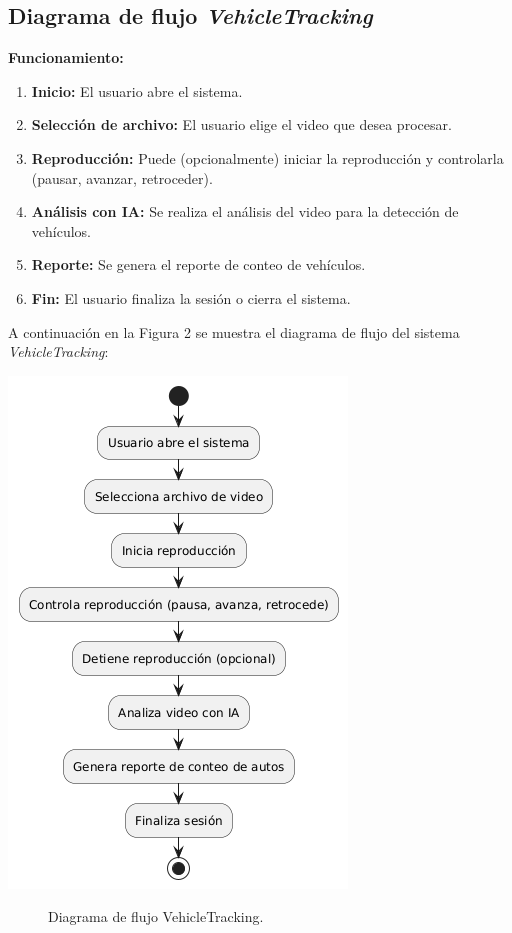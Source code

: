 \documentclass[protocolo.tex]{subfiles}
\begin{document}
\subsection{Diagrama de flujo \textit{VehicleTracking}} 
\textbf{Funcionamiento:}
\begin{enumerate}
    \item \textbf{Inicio:}  
    El usuario abre el sistema.
    \item \textbf{Selección de archivo:}  
    El usuario elige el video que desea procesar.
    \item \textbf{Reproducción:}  
    Puede (opcionalmente) iniciar la reproducción y controlarla (pausar, avanzar, retroceder).
    \item \textbf{Análisis con IA:}
    Se realiza el análisis del video para la detección de vehículos.
    \item \textbf{Reporte:}
    Se genera el reporte de conteo de vehículos.
    \item \textbf{Fin:}      
    El usuario finaliza la sesión o cierra el sistema.
\end{enumerate}

A continuación en la Figura 2 se muestra el diagrama de flujo del sistema \textit{VehicleTracking}:\vspace{4mm}

\begin{center}
\includegraphics[scale=0.6]{Imagenes/pdf/VehicleTkF.png}
\end{center}
\begin{figure}[h]  %
    \centering
    \caption{Diagrama de flujo VehicleTracking.}
    \label{fig:mi-figura2}
\end{figure}
\end{document}
